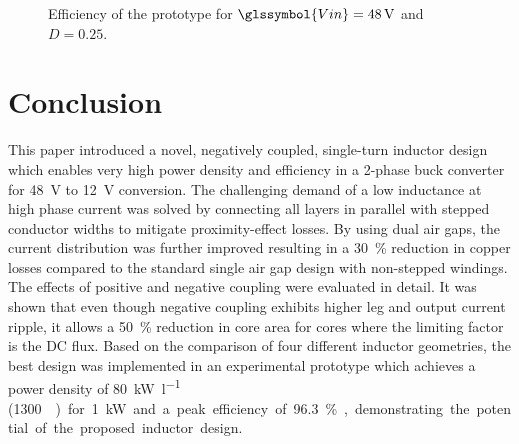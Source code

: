\documentclass{IPEC2026TEC}
\newcommand{\sbl}[1]{\glssymbol{#1}}
\begin{document}
\begin{figure}
  \centering
  
  \caption{Efficiency of the prototype for $\sbl{Vin}=\qty{48}{\V}$ and $D=0.25$.}
  \label{fig:Efficiency}
\end{figure}

\section{Conclusion}
This paper introduced a novel, negatively coupled, single-turn inductor design which enables very high power density and efficiency in a 2-phase buck converter for \qty{48}{\V} to \qty{12}{\V} conversion. The challenging demand of a low inductance at high phase current was solved by connecting all layers in parallel with stepped conductor widths to mitigate proximity-effect losses. By using dual air gaps, the current distribution was further improved resulting in a \qty{30}{\percent} reduction in copper losses compared to the standard single air gap design with non-stepped windings. \\
The effects of positive and negative coupling were evaluated in detail. It was shown that even though negative coupling exhibits higher leg and output current ripple, it allows a \qty{50}{\percent} reduction in core area for cores where the limiting factor is the DC flux. Based on the comparison of four different inductor geometries, the best design was implemented in an experimental prototype which achieves a power density of \qty{80}{\kW\per\l} (\qty{1300}{\W\per\cubic\inch}) for \qty{1}{\kW} and a peak efficiency of \qty{96.3}{\percent}, demonstrating the potential of the proposed inductor design.



\end{document}

